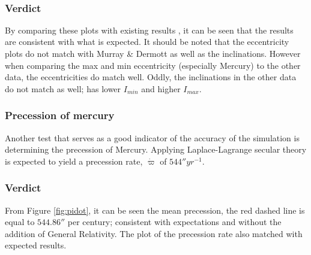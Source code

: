 \documentclass[11pt, oneside]{article}   	%
\begin{document}
\newpage
\ 
\newpage
\
\newpage

\subsubsection*{Verdict}

By comparing these plots with existing results \cite{ssd, texas}, it can be seen that the results are consistent with what is expected. It should be noted that the eccentricity plots do not match with Murray \& Dermott as well as the inclinations. However when comparing the max and min eccentricity (especially Mercury) to the other data\cite{texas}, the eccentricities do match well. Oddly, the inclinations in the other data\cite{texas} do not match as well; has lower $I_{min}$ and higher $I_{max}$.

\subsubsection{Precession of mercury}

Another test that serves as a good indicator of the accuracy of the simulation is determining the precession of Mercury. Applying Laplace-Lagrange secular theory is expected to yield a precession rate, $\dot{\varpi}$ of $544{}'' yr^{-1}$\cite{texas, PRMer}.

\subsubsection*{Verdict}

From Figure \ref{fig:pidot}, it can be seen the mean precession, the red dashed line is equal to $544.86{}''$ per century; consistent with expectations and without the addition of General Relativity. The plot of the precession rate also matched with expected results\cite{texas}.
        
\end{document}
